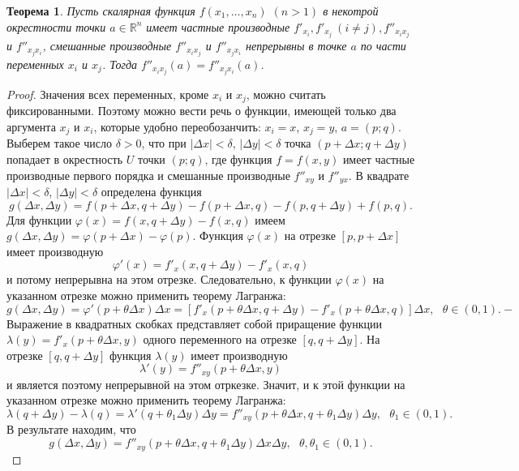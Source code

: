 \documentclass[12pt]{report}
\numberwithin{equation}{section}
\newtheorem{theorem}{Теорема}[section]
\begin{document}
\begin{theorem} \label{th:40:1}
Пусть скалярная функция $f(x_1, \ldots, x_n)$ $(n > 1)$ в некотрой окрестности точки $a \in \mathbb{R}^n$ имеет частные производные $f'_{x_i}, f'_{x_j}~(i \neq j), f''_{x_i x_j}$ и $f''_{x_j x_i}$, смешанные производные $f''_{x_i x_j}$ и $f''_{x_j x_i}$ непрерывны в точке $a$ по части переменных $x_i$ и $x_j$. Тогда $f''_{x_i x_j} (a) = f''_{x_j x_i}(a)$.
\end{theorem}
\begin{proof}
Значения всех переменных, кроме $x_i$ и $x_j$, можно считать фиксированными. Поэтому можно вести речь о функции, имеющей только два аргумента $x_j$ и $x_i$, которые удобно переобозанчить: $x_i = x$, $x_j = y$, $a = (p;q)$.\\

Выберем такое число $\delta > 0$, что при $|\Delta x| < \delta$, $|\Delta y| < \delta$ точка $(p + \Delta x; q + \Delta y)$ попадает в окрестность $U$ точки $(p;q)$, где функция $f = f(x,y)$ имеет частные производные первого порядка и смешанные производные $f''_{xy}$ и $f''_{yx}$. В квадрате $|\Delta x| < \delta$, $|\Delta y| < \delta$ определена функция
\[ g(\Delta x, \Delta y) = f(p + \Delta x, q + \Delta y) - f(p + \Delta x, q) - f(p, q + \Delta y) + f(p,q).\]
Для функции $\varphi(x) = f(x, q + \Delta y) - f (x,q)$ имеем $g(\Delta x, \Delta y) = \varphi(p + \Delta x) - \varphi(p)$. Функция $\varphi(x)$ на отрезке $[p, p + \Delta x]$ имеет производную
\[ \varphi'(x) = f'_x (x, q + \Delta y) - f'_x (x,q)\]
и потому непрерывна на этом отрезке. Следовательно, к функции $\varphi(x)$ на указанном отрезке можно применить теорему Лагранжа:
\[ g(\Delta x, \Delta y) = \varphi'(p + \theta \Delta x) \Delta x = [f'_x ( p + \theta \Delta x, q + \Delta y) - f'_x (p + \theta \Delta x, q)]\Delta x,~~~\theta \in (0,1).-\]
Выражение в квадратных скобках представляет собой приращение функции $\lambda (y) = f'_x(p + \theta \Delta x, y)$ одного переменного на отрезке $[q, q + \Delta y]$. На отрезке $[q, q + \Delta y]$ функция $\lambda(y)$ имеет производную
\[ \lambda'(y) = f''_{xy}(p + \theta \Delta x, y)\]
и является поэтому непрерывной на этом отркезке. Значит, и к этой функции на указанном отрезке можно применить теорему Лагранжа:
\[ \lambda(q + \Delta y) - \lambda(q) = \lambda'(q + \theta_1 \Delta y)\Delta y = f''_{xy} (p + \theta \Delta x, q + \theta_1 \Delta y) \Delta y,~~~\theta_1 \in (0,1).\]
В результате находим, что
\begin{equation} \label{eq:40:1}
g(\Delta x, \Delta y) = f''_{xy} (p + \theta \Delta x, q  +\theta_1 \Delta y) \Delta x \Delta y,~~~ \theta, \theta_1 \in (0,1).

\end{equation}
\end{proof}
\end{document}
